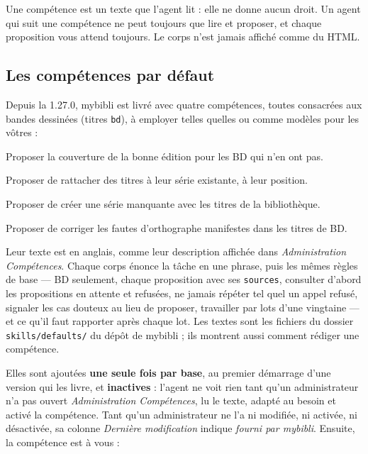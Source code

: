 \begin{note}
Une compétence est un texte que l'agent lit : elle ne donne aucun droit.
Un agent qui suit une compétence ne peut toujours que lire et proposer,
et chaque proposition vous attend toujours. Le corps n'est jamais
affiché comme du HTML.
\end{note}

\subsection{Les compétences par défaut}
\label{sec:agents-skills-defaults}

Depuis la 1.27.0, mybibli est livré avec quatre compétences, toutes
consacrées aux bandes dessinées (titres \texttt{bd}), à employer telles
quelles ou comme modèles pour les vôtres :

\begin{description}[style=nextline]
  \item[\texttt{comics-covers}] Proposer la couverture de la bonne
        édition pour les BD qui n'en ont pas.
  \item[\texttt{comics-series-attach}] Proposer de rattacher des titres
        à leur série existante, à leur position.
  \item[\texttt{comics-series-create}] Proposer de créer une série
        manquante avec les titres de la bibliothèque.
  \item[\texttt{comics-title-spelling}] Proposer de corriger les fautes
        d'orthographe manifestes dans les titres de BD.
\end{description}

Leur texte est en anglais, comme leur description affichée dans
\emph{Administration \textrightarrow{} Compétences}. Chaque corps énonce
la tâche en une phrase, puis les mêmes règles de base --- BD seulement,
chaque proposition avec ses \texttt{sources}, consulter d'abord les
propositions en attente et refusées, ne jamais répéter tel quel un appel
refusé, signaler les cas douteux au lieu de proposer, travailler par
lots d'une vingtaine --- et ce qu'il faut rapporter après chaque lot.
Les textes sont les fichiers du dossier \texttt{skills/defaults/} du
dépôt de mybibli ; ils montrent aussi comment rédiger une compétence.

Elles sont ajoutées \textbf{une seule fois par base}, au premier
démarrage d'une version qui les livre, et \textbf{inactives} : l'agent
ne voit rien tant qu'un administrateur n'a pas ouvert
\emph{Administration \textrightarrow{} Compétences}, lu le texte,
adapté au besoin et activé la compétence. Tant qu'un administrateur ne
l'a ni modifiée, ni activée, ni désactivée, sa colonne \emph{Dernière
modification} indique \emph{fourni par mybibli}. Ensuite, la compétence
est à vous :

